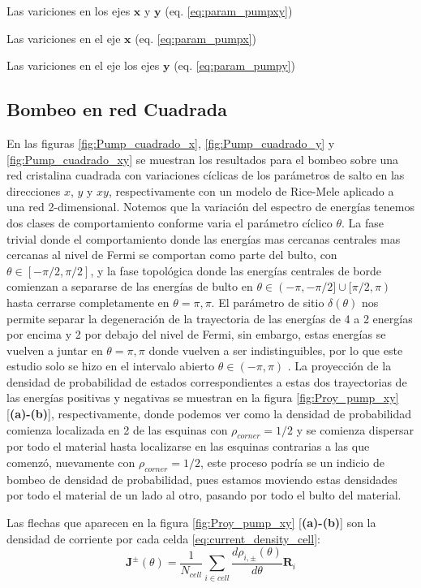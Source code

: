 Las variciones en los ejes $\mathbf{x}$ y $\mathbf{y}$ (eq. \ref{eq:param_pumpxy})


Las variciones en el eje $\mathbf{x}$ (eq. \ref{eq:param_pumpx})


Las variciones en el eje los ejes $\mathbf{y}$ (eq. \ref{eq:param_pumpy})

\subsection{Bombeo en red Cuadrada}

En las figuras \ref{fig:Pump_cuadrado_x}, \ref{fig:Pump_cuadrado_y} y \ref{fig:Pump_cuadrado_xy} se muestran los resultados para el bombeo sobre una red cristalina cuadrada con variaciones cíclicas de los parámetros de salto en las direcciones $x$, $y$ y $xy$, respectivamente con un modelo de Rice-Mele aplicado a una red 2-dimensional. Notemos que la variación del espectro de energías tenemos dos clases de comportamiento conforme varia el parámetro cíclico $\theta$. La fase trivial donde el comportamiento donde las energías mas cercanas centrales mas cercanas al nivel de Fermi se comportan como parte del bulto, con $\theta \in [-\pi/2, \pi/2]$, y la fase topológica donde las energías centrales de borde comienzan a separarse de las energías de bulto en $\theta \in (-\pi,-\pi/2] \cup [\pi/2,\pi)$ hasta cerrarse completamente en $\theta = \pi,\pi$. El parámetro de sitio $\delta(\theta)$ nos permite separar la degeneración de la trayectoria de las energías de 4 a 2 energías por encima y 2 por debajo del nivel de Fermi, sin embargo, estas energías se vuelven a juntar en $\theta = \pi,\pi$ donde vuelven a ser indistinguibles, por lo que este estudio solo se hizo en el intervalo abierto $\theta \in (-\pi,\pi)$ . 
La proyección de la densidad de probabilidad de estados correspondientes a estas dos trayectorias de las energías positivas y negativas se muestran en la figura \ref{fig:Proy_pump_xy} [\textbf{(a)-(b)}], respectivamente, donde podemos ver como la densidad de probabilidad comienza localizada en 2 de las esquinas con $\rho_{corner} = 1/2$ y se comienza dispersar por todo el material hasta localizarse en las esquinas contrarias a las que comenzó, nuevamente con $\rho_{corner} = 1/2$, este proceso podría se un indicio de bombeo de densidad de probabilidad, pues estamos moviendo estas densidades por todo el material de un lado al otro, pasando por todo el bulto del material. 

Las flechas que aparecen en la figura \ref{fig:Proy_pump_xy} [\textbf{(a)-(b)}] son la densidad de corriente por cada celda \ref{eq:current_density_cell}:
\begin{equation}
    \label{eq:current_density_cell}
    \mathbf{J}^{\pm}(\theta) = \frac{1}{N_{cell}}\sum_{i \in cell} \frac{d \rho_{i,\pm}(\theta)}{d\theta} \mathbf{R}_i  
\end{equation}

